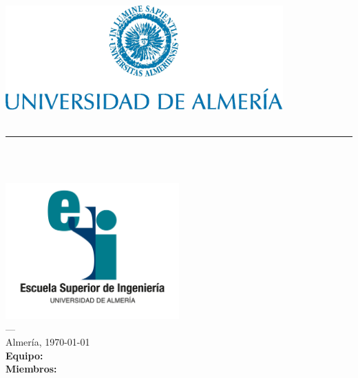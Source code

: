 \begin{titlepage}
 

\newlength{\centeroffset}
\setlength{\centeroffset}{-0.5\oddsidemargin}
\addtolength{\centeroffset}{0.5\evensidemargin}
\thispagestyle{empty}

\noindent\hspace*{\centeroffset}\begin{minipage}{\textwidth}

\centering
\includegraphics[width=0.8\textwidth]{Cabecera/imagenes/logo_ual.jpg}\\[0.8cm]



{\Huge\bfseries \tipoDoc \\ }
\noindent\rule[-1ex]{\textwidth}{3pt}\\[3ex]

\textsc{ \Huge \asignatura \\[0.7cm]}

\end{minipage}

\vspace{2.3cm}
\noindent\hspace*{\centeroffset}\begin{minipage}{\textwidth}
\centering

\includegraphics[width=0.5\textwidth]{Cabecera/imagenes/logoesi.JPG}\\[0.1cm]

\textsc{---}\\
Almería, \today \\[1cm]

\textbf{Equipo:} {\equipo}\\[0.2cm]
\textbf{Miembros:}\\ {\primerAl\\ \segunAl \\ \tercerAl}\\[1cm]


\end{minipage}

\end{titlepage}


